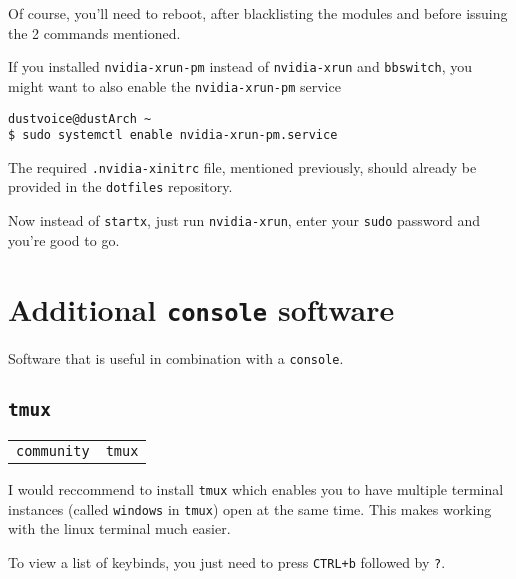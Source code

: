 \documentclass[9pt]{report}
\newenvironment{NOTE}
{\begin{tcolorbox}[colback=admonitionBG,coltitle=draculaFG,colframe=draculaBlue,colbacktitle=draculaBlue,title=NOTE]}
{\end{tcolorbox}}
\newenvironment{packagetable}
{\begin{longtabu}to \textwidth [b]{X[1,r]|X[1,l]}}
{\end{longtabu}}
\begin{document}
\begin{NOTE}
    Of course, you’ll need to reboot, after blacklisting the modules and before issuing the 2 commands mentioned.

\end{NOTE}
\begin{NOTE}
    If you installed \texttt{nvidia-xrun-pm} instead of \texttt{nvidia-xrun} and \texttt{bbswitch}, you might want to also enable the \texttt{nvidia-xrun-pm} service


    \begin{verbatim}
dustvoice@dustArch ~
$ sudo systemctl enable nvidia-xrun-pm.service
    \end{verbatim}
\end{NOTE}
\begin{NOTE}
    The required \texttt{.nvidia-xinitrc} file, mentioned previously, should already be provided in the \texttt{dotfiles} repository.

\end{NOTE}
Now instead of \texttt{startx}, just run \texttt{nvidia-xrun}, enter your \texttt{sudo} password and you’re good to go.



\newpage

\hypertarget{x-additional-console-software}{\section{Additional \texttt{console} software}}
Software that is useful in combination with a \texttt{console}.



\newpage

\hypertarget{x-tmux}{\subsection{\texttt{tmux}}}
\begin{packagetable}
    \texttt{community} & \texttt{tmux} \\ 
\end{packagetable}

I would reccommend to install \texttt{tmux} which enables you to have multiple terminal instances (called \texttt{windows} in \texttt{tmux}) open at the same time.
This makes working with the linux terminal much easier.


\begin{NOTE}
    To view a list of keybinds, you just need to press \texttt{CTRL+b} followed by \texttt{?}.

\end{NOTE}
\end{document}
